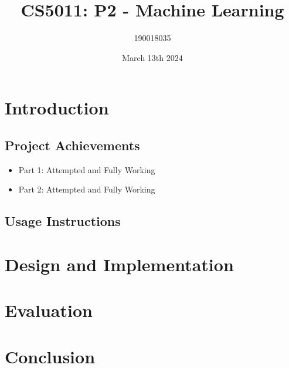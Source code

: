 \documentclass{article}
\title{CS5011: P2 - Machine Learning}
\author{190018035}
\date{March 13th 2024}
\begin{document}
\maketitle

\tableofcontents

\section{Introduction}

\subsection{Project Achievements}
\begin{itemize}
    \item{Part 1: Attempted and Fully Working}
    \item{Part 2: Attempted and Fully Working}
\end{itemize}

\subsection{Usage Instructions}

\section{Design and Implementation}

\section{Evaluation}

\section{Conclusion}

\printbibliography
\end{document}
